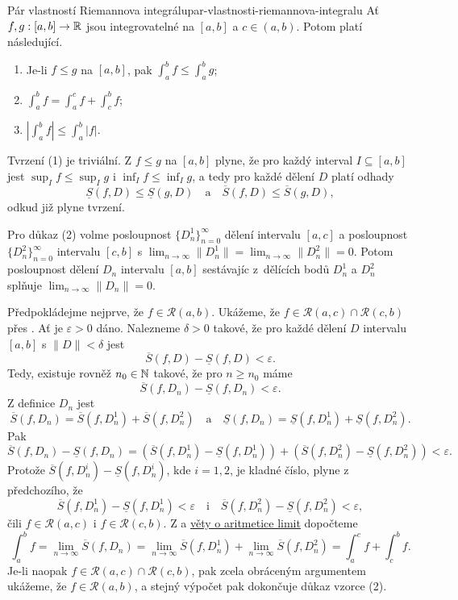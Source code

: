 \begin{theorem}{Pár vlastností Riemannova integrálu}{par-vlastnosti-riemannova-integralu}
 Ať $f,g:[a,b] \to \mathbb{R}$ jsou integrovatelné na $[a,b]$ a $c \in (a,b)$. Potom
 platí následující.
 \begin{enumerate}
  \item Je-li $f \leq g$ na $[a,b]$, pak $\int_{a}^{b} f \leq \int_{a}^{b} g$;
  \item $\int_{a}^{b} f = \int_{a}^{c} f + \int_{c}^{b} f$;
  \item $\left| \int_{a}^{b} f \right| \leq \int_{a}^{b} |f|$.
 \end{enumerate}
\end{theorem}
\begin{thmproof}
 Tvrzení (1) je triviální. Z $f \leq g$ na $[a,b]$ plyne, že pro každý interval
 $I \subseteq [a,b]$ jest $\sup_I f \leq \sup_I g$ i $\inf_I f \leq \inf_I g$, a
 tedy pro každé dělení $D$ platí odhady
 \[
  \underline{S}(f,D) \leq \underline{S}(g,D) \quad \text{a} \quad
  \overline{S}(f,D) \leq \overline{S}(g,D),
 \]
 odkud již plyne tvrzení.

 Pro důkaz (2) volme posloupnost $\{D_{n}^{1}\}_{n=0}^{\infty}$ dělení intervalu
 $[a,c]$ a posloupnost $\{D^2_n\}_{n=0}^{\infty}$ intervalu $[c,b]$ s $\lim_{n
 \to \infty} \|D^1_n\| = \lim_{n \to \infty} \|D^2_n\| = 0$. Potom posloupnost
 dělení $D_n$ intervalu $[a,b]$ sestávajíc z~dělících bodů $D^{1}_n$ a $D^2_n$
 splňuje $\lim_{n \to \infty} \|D_n\| = 0$.

 Předpokládejme nejprve, že $f \in \mathcal{R}(a,b)$. Ukážeme, že $f \in
 \mathcal{R}(a,c) \cap \mathcal{R}(c,b)$ přes
 . Ať je $\varepsilon>0$ dáno.
 Nalezneme $\delta>0$ takové, že pro každé dělení $D$ intervalu $[a,b]$ s
 $\|D\|<\delta$ jest
 \[
  \overline{S}(f,D) - \underline{S}(f,D) < \varepsilon.
 \]
 Tedy, existuje rovněž $n_0 \in \mathbb{N}$ takové, že pro $n \geq n_0$ máme
 \[
  \overline{S}(f,D_n) - \underline{S}(f,D_n) < \varepsilon.
 \]
 Z definice $D_n$ jest
 \[
  \overline{S}(f,D_n) = \overline{S}(f,D_n^1) + \overline{S}(f,D_n^2) \quad
  \text{a} \quad \underline{S}(f,D_n) = \underline{S}(f,D_n^{1}) +
  \underline{S}(f,D_n^2).
 \]
 Pak
 \[
  \overline{S}(f,D_n) - \underline{S}(f,D_n) = (\overline{S}(f,D_n^{1}) -
  \underline{S}(f,D_n^{1})) + (\overline{S}(f,D_n^2) - \underline{S}(f,D_n^2)) <
  \varepsilon.
 \]
 Protože $\overline{S}(f,D_n^{i}) - \underline{S}(f,D_n^{i})$, kde $i = 1,2$, je
 kladné číslo, plyne z předchozího, že
 \[
  \overline{S}(f,D_n^{1}) - \underline{S}(f,D_n^{1}) < \varepsilon \quad
  \text{i} \quad \overline{S}(f,D_n^2) - \underline{S}(f,D_n^2)<\varepsilon,
 \]
 čili $f \in \mathcal{R}(a,c)$ i $f \in \mathcal{R}(c,b)$. Z
  a \hyperref[thm:aritmetika-limit]{věty o
 aritmetice limit} dopočteme
 \[
  \int_{a}^{b} f = \lim_{n \to \infty} \overline{S}(f,D_n) = \lim_{n \to \infty}
  \overline{S}(f,D_n^{1}) + \lim_{n \to \infty} \overline{S}(f,D_n^2) =
  \int_{a}^{c} f + \int_{c}^{b} f.
 \]
 Je-li naopak $f \in \mathcal{R}(a,c) \cap \mathcal{R}(c,b)$, pak zcela
 obráceným argumentem ukážeme, že $f \in \mathcal{R}(a,b)$, a stejný výpočet pak
 dokončuje důkaz vzorce (2).


\end{thmproof}
